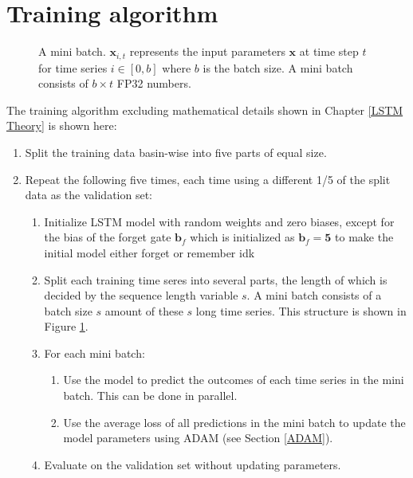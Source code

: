 \section{Training algorithm}
\begin{figure}
\centering

\caption{A mini batch. $\bm{x}_{i,t}$ represents the input parameters $\bm{x}$ at time step $t$ for time series $i \in [0, b]$ where $b$ is the batch size. A mini batch consists of $b \times t$ FP32 numbers.}
\label{mini batch}
\end{figure}
The training algorithm excluding mathematical details shown in Chapter \ref{LSTM Theory} 
is shown here:
\begin{enumerate}
    \item Split the training data basin-wise into five parts of equal size.
    \item Repeat the following five times, each time using a different 1/5 of the 
        split data as the validation set: \begin{enumerate}
            \item Initialize LSTM model with random weights and zero biases, except for the bias of the forget gate $\bm{b}_f$ which is initialized as $\bm{b}_f=\bm{5}$ to make the initial model either forget or remember idk \citationneeded
        \item Split each training time seres into several parts, the length 
            of which is decided by the sequence length variable $s$. A mini batch 
            consists of a batch size $s$ amount of these $s$ long time series. This 
                structure is shown in Figure \ref{mini batch}.
        \item For each mini batch:
        \begin{enumerate}
            \item Use the model to predict the outcomes of each time series in the 
                mini batch. This can be done in parallel.
            \item Use the average loss of all predictions in the mini batch to update 
                the model parameters using ADAM (see Section \ref{ADAM}).
        \end{enumerate}
        \item Evaluate on the validation set without updating parameters.
    \end{enumerate}
\end{enumerate}
